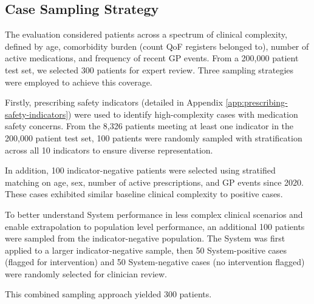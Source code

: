 \subsection{Case Sampling Strategy}
\label{sec:case-sampling}

    The evaluation considered patients across a spectrum of clinical complexity, defined by age, comorbidity burden (count QoF registers belonged to), number of active medications, and frequency of recent GP events. From a 200,000 patient test set, we selected 300 patients for expert review. Three sampling strategies were employed to achieve this coverage.

    Firstly, prescribing safety indicators (detailed in Appendix \ref{app:prescribing-safety-indicators}) were used to identify high-complexity cases with medication safety concerns. From the 8,326 patients meeting at least one indicator in the 200,000 patient test set, 100 patients were randomly sampled with stratification across all 10 indicators to ensure diverse representation.

    In addition, 100 indicator-negative patients were selected using stratified matching on age, sex, number of active prescriptions, and GP events since 2020. These cases exhibited similar baseline clinical complexity to positive cases.

    To better understand System performance in less complex clinical scenarios and enable extrapolation to population level performance, an additional 100 patients were sampled from the indicator-negative population. The System was first applied to a larger indicator-negative sample, then 50 System-positive cases (flagged for intervention) and 50 System-negative cases (no intervention flagged) were randomly selected for clinician review.

    This combined sampling approach yielded 300 patients.  
    
